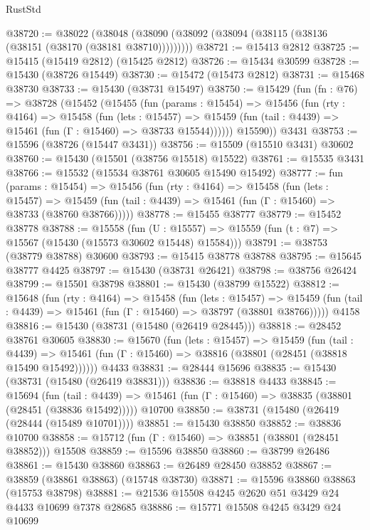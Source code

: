 \begin{lexlean}{RustStd}
\begin{coremodule}
{\begin{coremodule}
{{{{{{{{{{{{{{{{{{{{{{{{{{{{{{{{{{{{{{{{{{{{{{{{{{{{{{{{{{{{@38720 := @38022
    (@38048 (@38090 (@38092 (@38094 (@38115 (@38136 (@38151 (@38170 (@38181 @38710)))))))))
@38721 := @15413 @2812
@38725 := @15415 (@15419 @2812) (@15425 @2812)
@38726 := @15434 @30599
@38728 := @15430 (@38726 @15449)
@38730 := @15472 (@15473 @2812)
@38731 := @15468 @38730
@38733 := @15430 (@38731 @15497)
@38750 := @15429
    (fun (fn : @76) =>
    @38728
      (@15452
        (@15455
          (fun (params : @15454) =>
          @15456
            (fun (rty : @4164) =>
            @15458
              (fun (lets : @15457) =>
              @15459 (fun (tail : @4439) => @15461 (fun (Γ : @15460) => @38733 @15544))))))
        @15590))
    @3431
@38753 := @15596 (@38726 (@15447 @3431))
@38756 := @15509 (@15510 @3431) @30602
@38760 := @15430 (@15501 (@38756 @15518) @15522)
@38761 := @15535 @3431
@38766 := @15532 (@15534 @38761 @30605 @15490 @15492)
@38777 := fun (params : @15454) =>
  @15456
    (fun (rty : @4164) =>
    @15458
      (fun (lets : @15457) =>
      @15459 (fun (tail : @4439) => @15461 (fun (Γ : @15460) => @38733 (@38760 @38766)))))
@38778 := @15455 @38777
@38779 := @15452 @38778
@38788 := @15558
    (fun (U : @15557) => @15559 (fun (t : @7) => @15567 (@15430 (@15573 @30602 @15448) @15584)))
@38791 := @38753 (@38779 @38788) @30600
@38793 := @15415 @38778 @38788
@38795 := @15645 @38777 @4425
@38797 := @15430 (@38731 @26421)
@38798 := @38756 @26424
@38799 := @15501 @38798
@38801 := @15430 (@38799 @15522)
@38812 := @15648
    (fun (rty : @4164) =>
    @15458
      (fun (lets : @15457) =>
      @15459 (fun (tail : @4439) => @15461 (fun (Γ : @15460) => @38797 (@38801 @38766)))))
    @4158
@38816 := @15430 (@38731 (@15480 (@26419 @28445)))
@38818 := @28452 @38761 @30605
@38830 := @15670
    (fun (lets : @15457) =>
    @15459
      (fun (tail : @4439) =>
      @15461 (fun (Γ : @15460) => @38816 (@38801 (@28451 (@38818 @15490 @15492))))))
    @4433
@38831 := @28444 @15696
@38835 := @15430 (@38731 (@15480 (@26419 @38831)))
@38836 := @38818 @4433
@38845 := @15694
    (fun (tail : @4439) => @15461 (fun (Γ : @15460) => @38835 (@38801 (@28451 (@38836 @15492)))))
    @10700
@38850 := @38731 (@15480 (@26419 (@28444 (@15489 @10701))))
@38851 := @15430 @38850
@38852 := @38836 @10700
@38858 := @15712 (fun (Γ : @15460) => @38851 (@38801 (@28451 @38852))) @15508
@38859 := @15596 @38850
@38860 := @38799 @26486
@38861 := @15430 @38860
@38863 := @26489 @28450 @38852
@38867 := @38859 (@38861 @38863) (@15748 @38730)
@38871 := @15596 @38860 @38863 (@15753 @38798)
@38881 := @21536 @15508 @4245 @2620 @51 @3429 @24 @4433 @10699 @7378 @28685
@38886 := @15771 @15508 @4245 @3429 @24 @10699
}}}}}}}}}}}}}}}}}}}}}}}}}}}}}}}}}}}}}}}}}}}}}}}}}}}}}}}}}}}}
\end{coremodule}}
\end{coremodule}
\end{lexlean}
